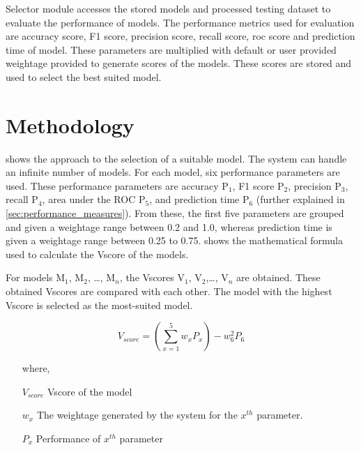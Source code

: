 Selector module accesses the stored models and processed testing dataset to evaluate the performance of models. The performance metrics used for evaluation are accuracy score, F1 score, precision score, recall score, roc score and prediction time of model. These parameters are multiplied with default or user provided weightage provided to generate scores of the models. These scores are stored and used to select the best suited model.

\section{Methodology}\label{sec:methodology}

 shows the approach to the selection of a suitable model. The system can handle an infinite number of models. For each model, six performance parameters are used. These performance parameters are accuracy P$_1$, F1 score P$_2$, precision P$_3$, recall P$_4$, area under the ROC P$_5$, and prediction time P$_6$ (further explained in \cref{sec:performance_measures}). From these, the first five parameters are grouped and given a weightage range between 0.2 and 1.0, whereas prediction time is given a weightage range between 0.25 to 0.75.  shows the mathematical formula used to calculate the Vscore of the models.

For models M$_1$, M$_2$, \ldots, M$_n$, the Vscores V$_1$, V$_2$,\ldots, V$_n$ are obtained. These obtained Vscores are compared with each other. The model with the highest Vscore is selected as the most-suited model.

\begin{equation}\label{eq:v_score}
    V_{score} = \left(\sum_{x=1}^{5} w_xP_x\right) - w_6^2P_6
\end{equation}

\begin{itemize}
    \item[where,]
    \item[$V_{score}$] Vscore of the model
    \item[$w_x$] The weightage generated by the system for the $x^{th}$ parameter.
    \item[$P_x$] Performance of $x^{th}$ parameter
\end{itemize}

